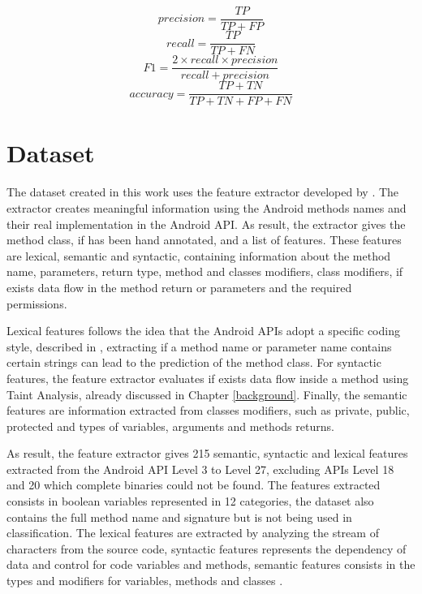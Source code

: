 \begin{multicols}{2}%
    \noindent%
    {%
    \begin{equation} \label{precision} precision = \frac{TP}{TP+FP} \end{equation}%
    \begin{equation} \label{recall} recall = \frac{TP}{TP+FN} \end{equation}%
    }%
    {%
    \begin{equation} \label{f1} F1 = \frac{2 \times recall \times precision}{recall + precision} \end{equation}%
    \begin{equation} \label{accuracy} accuracy = \frac{TP+TN}{TP+TN+FP+FN} \end{equation}%
    }%
\end{multicols}

\section{Dataset}\label{dset_section}

The dataset created in this work uses the feature extractor developed by \cite{rasthofer2014machine}. The extractor creates meaningful information using the Android methods names and their real implementation in the Android API. As result, the extractor gives the method class, if has been hand annotated, and a list of features. These features are lexical, semantic and syntactic, containing information about the method name, parameters, return type, method and classes modifiers, class modifiers, if exists data flow in the method return or parameters and the required permissions.

Lexical features follows the idea that the Android APIs adopt a specific coding style, described in \cite{androidcoderef}, extracting if a method name or parameter name contains certain strings can lead to the prediction of the method class. For syntactic features, the feature extractor evaluates if exists data flow inside a method using Taint Analysis, already discussed in Chapter \ref{background}. Finally, the semantic features are information extracted from classes modifiers, such as private, public, protected and types of variables, arguments and methods returns.

As result, the feature extractor gives 215 semantic, syntactic and lexical features extracted from the Android API Level 3 to Level 27, excluding APIs Level 18 and 20 which complete binaries could not be found. The features extracted consists in boolean variables represented in 12 categories, the dataset also contains the full method name and signature but is not being used in classification. The lexical features are extracted by analyzing the stream of characters from the source code, syntactic features represents the dependency of data and control for code variables and methods, semantic features consists in the types and modifiers for variables, methods and classes \cite{aho2003compilers}.

